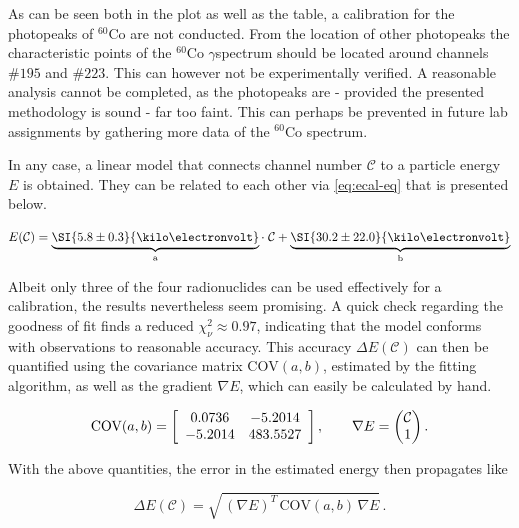 

As can be seen both in the plot as well as the table, a calibration for the
photopeaks of $^{60}$Co are not conducted. From the location of other photopeaks the
characteristic points of the $^{60}$Co $\gamma$spectrum should be located around
channels $\#195$ and $\#223$. This can however not be experimentally verified. A
reasonable analysis cannot be completed, as the photopeaks are - provided the
presented methodology is sound - far too faint. This can perhaps be prevented in
future lab assignments by gathering more data of the $^{60}$Co spectrum.

In any case, a linear model that connects channel number $\mathcal{C}$ to a particle
energy $E$ is obtained. They can be related to each other via \autoref{eq:ecal-eq}
that is presented below.

\begin{equation}
\label{eq:ecal-eq}
	E(\mathcal{C}) = \underbrace{\SI{5.8\pm0.3}{\kilo\electronvolt}}_\text{a}\cdot\;\mathcal{C} + \underbrace{\SI{30.2\pm22.0}{\kilo\electronvolt}}_\text{b}
\end{equation}

Albeit only three of the four radionuclides can be used effectively for a
calibration, the results nevertheless seem promising. A quick check regarding the
goodness of fit finds a reduced $\chi^{2}_\nu\approx0.97$, indicating that the model
conforms with observations to reasonable accuracy. This accuracy $\Delta E
(\mathcal{C})$ can then be quantified using the covariance matrix $\text{COV}(a,b)$,
estimated by the fitting algorithm, as well as the gradient $\nabla E$, which can
easily be calculated by hand.

\begin{equation}
	\text{COV}(a,b) =
	\left[
	\begin{array}{c c}
	0.0736 & -5.2014 \\
	-5.2014 & 483.5527
	\end{array}
	\right],
	\qquad\nabla E = \begin{pmatrix}\mathcal{C}\\1\end{pmatrix}.
\end{equation}

With the above quantities, the error in the estimated energy then propagates like

\begin{equation}
\label{eq:energy-error}
	\Delta E(\mathcal{C}) = \sqrt{\,(\nabla E)^{T}\,\text{COV}(a,b)\,\nabla E}\,.
\end{equation}
